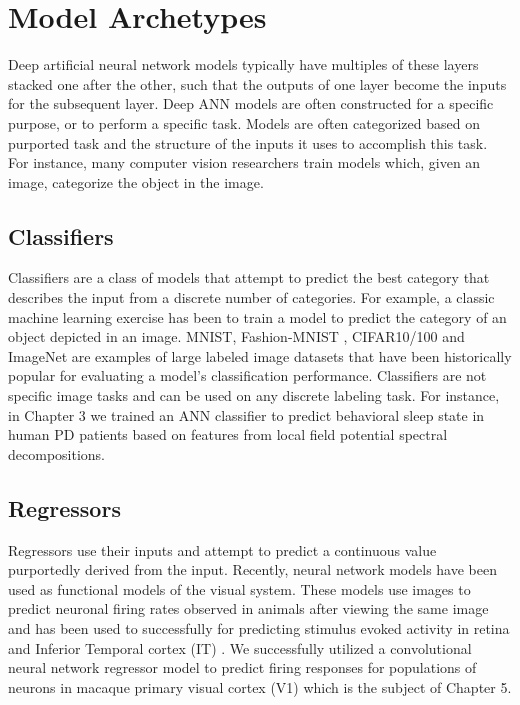 \documentclass{templates/ucdenverthesis}
\begin{document}
\hypertarget{sec:modarchetypes}{%
\section{Model Archetypes}\label{sec:modarchetypes}}

Deep artificial neural network models typically have multiples of these layers stacked one after the other, such that the outputs of one layer become the inputs for the subsequent layer. Deep ANN models are often constructed for a specific purpose, or to perform a specific task. Models are often categorized based on purported task and the structure of the inputs it uses to accomplish this task. For instance, many computer vision researchers train models which, given an image, categorize the object in the image.

\hypertarget{sec:classifiers}{%
\subsection{Classifiers}\label{sec:classifiers}}

Classifiers are a class of models that attempt to predict the best category that describes the input from a discrete number of categories. For example, a classic machine learning exercise has been to train a model to predict the category of an object depicted in an image. MNIST, Fashion-MNIST \autocite{Xiao:2017wj}, CIFAR10/100 \autocite{Krizhevsky:2009tr} and ImageNet are examples of large labeled image datasets that have been historically popular for evaluating a model's classification performance. Classifiers are not specific image tasks and can be used on any discrete labeling task. For instance, in Chapter 3 we trained an ANN classifier to predict behavioral sleep state in human PD patients based on features from local field potential spectral decompositions.

\hypertarget{sec:regressors}{%
\subsection{Regressors}\label{sec:regressors}}

Regressors use their inputs and attempt to predict a continuous value purportedly derived from the input. Recently, neural network models have been used as functional models of the visual system. These models use images to predict neuronal firing rates observed in animals after viewing the same image and has been used to successfully for predicting stimulus evoked activity in retina \autocite{NIPS2016_6388} and Inferior Temporal cortex (IT) \autocite{Yamins:2014gi}. We successfully utilized a convolutional neural network regressor model to predict firing responses for populations of neurons in macaque primary visual cortex (V1) which is the subject of Chapter 5.
\end{document}
